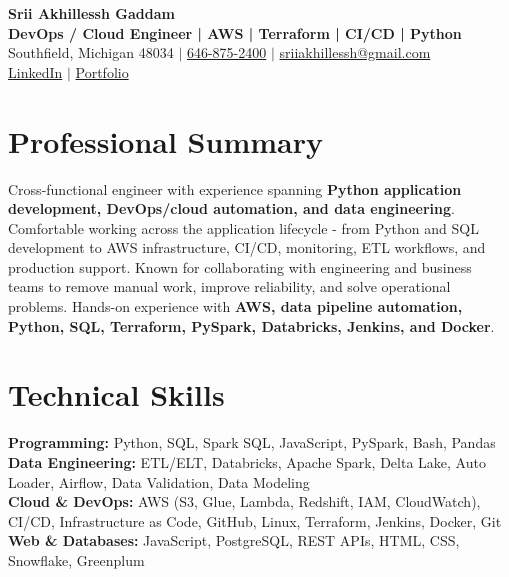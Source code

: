 \documentclass[letterpaper,10pt]{article}
\begin{document}
\fontsize{9.35pt}{10.45pt}\selectfont

\begin{center}
    {\LARGE \textbf{Srii Akhillessh Gaddam}} \\[-1pt]
    \textbf{DevOps / Cloud Engineer | AWS | Terraform | CI/CD | Python} \\[2pt]
    Southfield, Michigan 48034 $|$
    \href{tel:6468752400}{646-875-2400} $|$
    \href{mailto:sriiakhillessh@gmail.com}{sriiakhillessh@gmail.com} \\[1pt]
    \href{https://www.linkedin.com/in/srii-akhiilessh-gaddam-b48668191/}{LinkedIn} $|$
    \href{https://sriiakhillesshg.github.io/portfolio/}{Portfolio}
\end{center}
\vspace{-8pt}

\section{Professional Summary}
\small{Cross-functional engineer with experience spanning \textbf{Python application development, DevOps/cloud automation, and data engineering}. Comfortable working across the application lifecycle - from Python and SQL development to AWS infrastructure, CI/CD, monitoring, ETL workflows, and production support. Known for collaborating with engineering and business teams to remove manual work, improve reliability, and solve operational problems. Hands-on experience with \textbf{AWS, data pipeline automation, Python, SQL, Terraform, PySpark, Databricks, Jenkins, and Docker}.}

\section{Technical Skills}
\small{
\textbf{Programming:} Python, SQL, Spark SQL, JavaScript, PySpark, Bash, Pandas \\
\textbf{Data Engineering:} ETL/ELT, Databricks, Apache Spark, Delta Lake, Auto Loader, Airflow, Data Validation, Data Modeling \\
\textbf{Cloud \& DevOps:} AWS (S3, Glue, Lambda, Redshift, IAM, CloudWatch), CI/CD, Infrastructure as Code, GitHub, Linux, Terraform, Jenkins, Docker, Git \\
\textbf{Web \& Databases:} JavaScript, PostgreSQL, REST APIs, HTML, CSS, Snowflake, Greenplum
}
\end{document}

